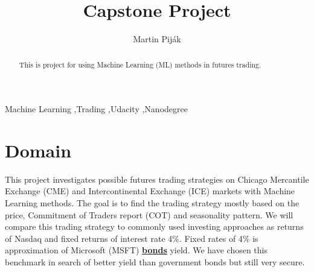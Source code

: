 \documentclass[final,2p]{elsarticle}
\begin{document}
\begin{frontmatter}

\title{Capstone Project}

\author{Martin Pij{\'a}k}

\address{Bratislava, Slovakia}

\begin{abstract}
This is project for using Machine Learning (ML) methods in futures trading.
\end{abstract}

\begin{keyword}
Machine Learning \sep{Trading} \sep{Udacity} \sep{Nanodegree}

\end{keyword}

\end{frontmatter}


\section{Domain}

This project investigates possible futures trading strategies on Chicago Mercantile Exchange (CME) and Intercontinental Exchange (ICE) markets with Machine Learning methods. The goal is to find the trading strategy mostly based on the price, Commitment of Traders report (COT) and seasonality pattern. We will compare this trading strategy to commonly used investing approaches as returns of Nasdaq and fixed returns of interest rate 4\%.
Fixed rates of 4\% is approximation of Microsoft (MSFT) \href{https://markets.businessinsider.com/bonds/microsoft\_corpdl-notes\_201717-57-bond-2057-us594918cb81}{\textbf{bonds}} yield. We have chosen this benchmark in search of better yield than government bonds but still very secure.
\end{document}
